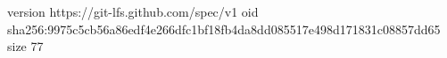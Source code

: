 version https://git-lfs.github.com/spec/v1
oid sha256:9975c5cb56a86edf4e266dfc1bf18fb4da8dd085517e498d171831c08857dd65
size 77
